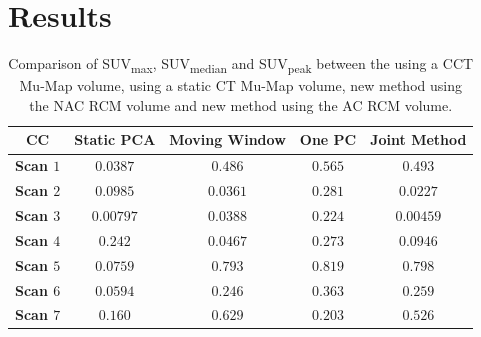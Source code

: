 \section{Results} \label{sec:results}
    \begin{table}
        \centering
        \captionsetup{singlelinecheck=false, justification=centering}
        \caption{Comparison of \gls{SUV}\textsubscript{max}, \gls{SUV}\textsubscript{median} and \gls{SUV}\textsubscript{peak} between the  using a \gls{CCT} \gls{Mu-Map} volume,  using a static \gls{CT} \gls{Mu-Map} volume, new method using the \gls{NAC} \gls{RCM} volume and new method using the \gls{AC} \gls{RCM} volume.}
        
        \resizebox*{1.0\linewidth}{!}
        {
            \begin{tabular}{||c|cccc||}
                \hline
                \textbf{\gls{CC}} & \textbf{Static \gls{PCA}} & \textbf{Moving Window} & \textbf{One \gls{PC}} & \textbf{Joint Method} \\
                \hline
                \textbf{Scan $1$}   & $0.0387$  & $0.486$  & $0.565$  & $0.493$   \\
                \textbf{Scan $2$}   & $0.0985$  & $0.0361$ & $0.281$  & $0.0227$  \\
                \textbf{Scan $3$}   & $0.00797$ & $0.0388$ & $0.224$  & $0.00459$ \\
                \textbf{Scan $4$}   & $0.242$   & $0.0467$ & $0.273$  & $0.0946$ \\
                \textbf{Scan $5$}   & $0.0759$  & $0.793$  & $0.819$  & $0.798$ \\
                \textbf{Scan $6$}   & $0.0594$  & $0.246$  & $0.363$  & $0.259$ \\
                \textbf{Scan $7$}   & $0.160$   & $0.629$  & $0.203$  & $0.526$ \\
                \hline
            \end{tabular}
        }
        \label{tab:cross_correlation}
    \end{table}
    
